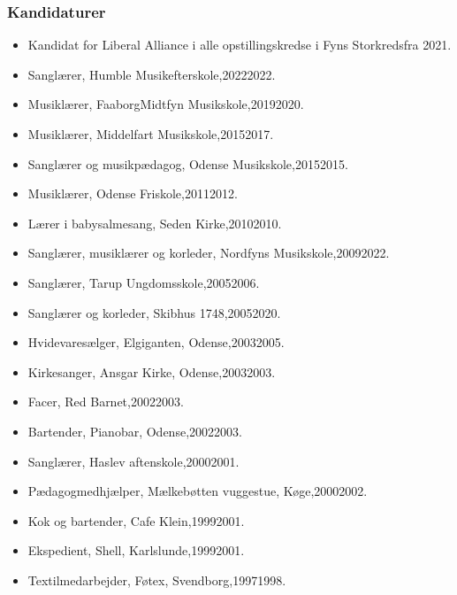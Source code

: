 \documentclass[11pt, a4paper]{awesome-cv}
\begin{document}
\begin{cvletter}
\subsubsection*{Kandidaturer}
\begin{itemize}
\item Kandidat for Liberal Alliance i alle opstillingskredse i Fyns Storkredsfra 2021.
\end{itemize}
\begin{itemize}
\item Sanglærer, Humble Musikefterskole,20222022.
\item Musiklærer, FaaborgMidtfyn Musikskole,20192020.
\item Musiklærer, Middelfart Musikskole,20152017.
\item Sanglærer og musikpædagog, Odense Musikskole,20152015.
\item Musiklærer, Odense Friskole,20112012.
\item Lærer i babysalmesang, Seden Kirke,20102010.
\item Sanglærer, musiklærer og korleder, Nordfyns Musikskole,20092022.
\item Sanglærer, Tarup Ungdomsskole,20052006.
\item Sanglærer og korleder, Skibhus 1748,20052020.
\item Hvidevaresælger, Elgiganten, Odense,20032005.
\item Kirkesanger, Ansgar Kirke, Odense,20032003.
\item Facer, Red Barnet,20022003.
\item Bartender, Pianobar, Odense,20022003.
\item Sanglærer, Haslev aftenskole,20002001.
\item Pædagogmedhjælper, Mælkebøtten vuggestue, Køge,20002002.
\item Kok og bartender, Cafe Klein,19992001.
\item Ekspedient, Shell, Karlslunde,19992001.
\item Textilmedarbejder, Føtex, Svendborg,19971998.
\end{itemize}
\end{cvletter}
\end{document}
